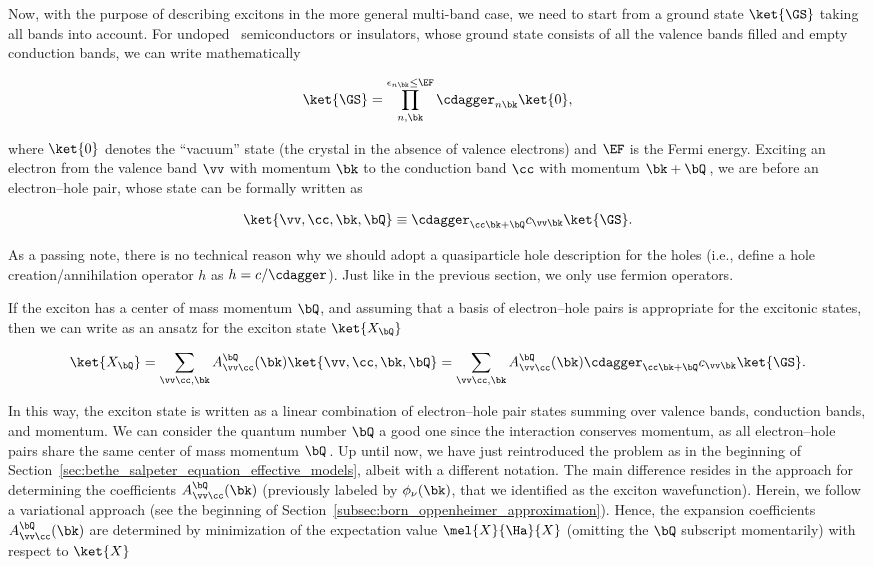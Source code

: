 Now, with the purpose of describing excitons in the more general multi-band case, we need to start from a ground state $\ket{\GS}$ taking all bands into account.
For undoped \bd~semiconductors or insulators, whose ground state consists of all the valence bands filled and empty conduction bands, we can write mathematically

\begin{equation}
    \ket{\GS} = \prod_{n,\bk}^{\epsilon_{n \bk} \leq \EF} \cdagger_{n \bk} \ket{0} ,
\end{equation}

\noindent where $\ket{0}$ denotes the \enquote{vacuum} state (the crystal in the absence of valence electrons) and $\EF$ is the Fermi energy.
Exciting an electron from the valence band $\vv $ with momentum $\bk$ to the conduction band $\cc $ with momentum $\bk+\bQ$\,, we are before an electron--hole pair, whose state can be formally written as

\begin{equation}
    \ket{\vv,\cc ,\bk,\bQ} \equiv \cdagger_{\cc  \bk+\bQ} c_{\vv \bk} \ket{\GS} .
\end{equation}

\noindent As a passing note, there is no technical reason why we should adopt a quasiparticle hole description for the holes (i.e., define a hole creation/annihilation operator $h$ as $h=c/\cdagger$).
Just like in the previous section, we only use fermion operators.

If the exciton has a center of mass momentum $\bQ$, and assuming that a basis of electron--hole pairs is appropriate for the excitonic states, then we can write as an ansatz for the exciton state $\ket{X_{\bQ}}$

\begin{equation}
    \ket{X_{\bQ}} = \sum_{\vv \cc ,\bk} A^{\bQ}_{\vv \cc }(\bk) \ket{\vv,\cc ,\bk,\bQ} = \sum_{\vv \cc ,\bk} A^{\bQ}_{\vv \cc }(\bk) \cdagger_{\cc  \bk+\bQ} c_{\vv \bk} \ket{\GS} .
\end{equation}

\noindent In this way, the exciton state is written as a linear combination of electron--hole pair states summing over valence bands, conduction bands, and momentum.
We can consider the quantum number $\bQ$ a good one since the interaction conserves momentum, as all electron--hole pairs share the same center of mass momentum $\bQ$\,.
Up until now, we have just reintroduced the problem as in the beginning of Section~\ref{sec:bethe_salpeter_equation_effective_models}, albeit with a different notation.
The main difference resides in the approach for determining the coefficients $A^{\bQ}_{\vv \cc }(\bk)$ (previously labeled by $\phi_{\nu}(\bk)$, that we identified as the exciton wavefunction).
Herein, we follow a variational approach (see the beginning of Section~\ref{subsec:born_oppenheimer_approximation}).
Hence, the expansion coefficients $A^{\bQ}_{\vv \cc }(\bk)$ are determined by minimization of the expectation value $\mel{X}{\Ha}{X}$  (omitting the $\bQ$ subscript momentarily) with respect to $\ket{X}$


